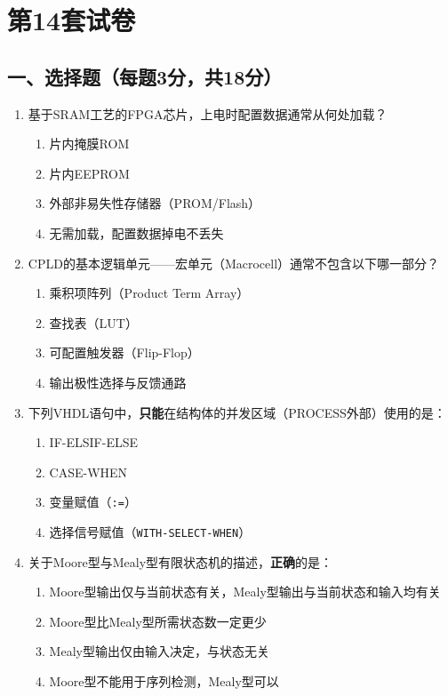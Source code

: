 \chapter{第14套试卷}

\section*{一、选择题（每题3分，共18分）}

\begin{enumerate}[label=\arabic*.]
\item 基于SRAM工艺的FPGA芯片，上电时配置数据通常从何处加载？
\begin{enumerate}[label=\Alph*.]
  \item 片内掩膜ROM
  \item 片内EEPROM
  \item 外部非易失性存储器（PROM/Flash）
  \item 无需加载，配置数据掉电不丢失
\end{enumerate}

\item CPLD的基本逻辑单元——宏单元（Macrocell）通常不包含以下哪一部分？
\begin{enumerate}[label=\Alph*.]
  \item 乘积项阵列（Product Term Array）
  \item 查找表（LUT）
  \item 可配置触发器（Flip-Flop）
  \item 输出极性选择与反馈通路
\end{enumerate}

\item 下列VHDL语句中，\textbf{只能}在结构体的并发区域（PROCESS外部）使用的是：
\begin{enumerate}[label=\Alph*.]
  \item IF-ELSIF-ELSE
  \item CASE-WHEN
  \item 变量赋值（\texttt{:=}）
  \item 选择信号赋值（\texttt{WITH-SELECT-WHEN}）
\end{enumerate}

\item 关于Moore型与Mealy型有限状态机的描述，\textbf{正确}的是：
\begin{enumerate}[label=\Alph*.]
  \item Moore型输出仅与当前状态有关，Mealy型输出与当前状态和输入均有关
  \item Moore型比Mealy型所需状态数一定更少
  \item Mealy型输出仅由输入决定，与状态无关
  \item Moore型不能用于序列检测，Mealy型可以
\end{enumerate}


\end{enumerate}
